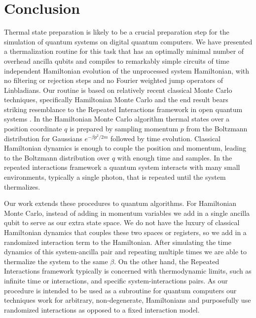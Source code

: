 \documentclass[
 amsmath,amssymb,
 aps,
onecolumn, 
nofootinbib]{revtex4-2}
\begin{document}
\section{Conclusion} \label{sec:conclusion}

Thermal state preparation is likely to be a crucial preparation step for the simulation of quantum systems on digital quantum computers. We have presented a thermalization routine for this task that has an optimally minimal number of overhead ancilla qubits and compiles to remarkably simple circuits of time independent Hamiltonian evolution of the unprocessed system Hamiltonian, with no filtering or rejection steps and no Fourier weighted jump operators of Linbladians. Our routine is based on relatively recent classical Monte Carlo techniques, specifically Hamiltonian Monte Carlo \cite{hoffman2011nouturnsampleradaptivelysetting} and the end result bears striking resemblance to the Repeated Interactions framework in open quantum systems \cite{prositto2025equilibrium}. In the Hamiltonian Monte Carlo algorithm thermal states over a position coordinate $q$ is prepared by sampling momentum $p$ from the Boltzmann distribution for Gaussians $e^{-\beta p^2/2m}$ followed by time evolution. Classical Hamiltonian dynamics is enough to couple the position and momentum, leading to the Boltzmann distribution over $q$ with enough time and samples. In the repeated interactions framework a quantum system interacts with many small environments, typically a single photon, that is repeated until the system thermalizes. 

Our work extends these procedures to quantum algorithms. For Hamiltonian Monte Carlo, instead of adding in momentum variables we add in a single ancilla qubit to serve as our extra state space. We do not have the luxury of classical Hamiltonian dynamics that couples these two spaces or registers, so we add in a randomized interaction term to the Hamiltonian. After simulating the time dynamics of this system-ancilla pair and repeating multiple times we are able to thermalize the system to the same $\beta$. On the other hand, the Repeated Interactions framework typically is concerned with thermodynamic limits, such as infinite time or interactions, and specific system-interactions pairs. As our procedure is intended to be used as a subroutine for quantum computers our techniques work for arbitrary, non-degenerate, Hamiltonians and purposefully use randomized interactions as opposed to a fixed interaction model.
\end{document}
